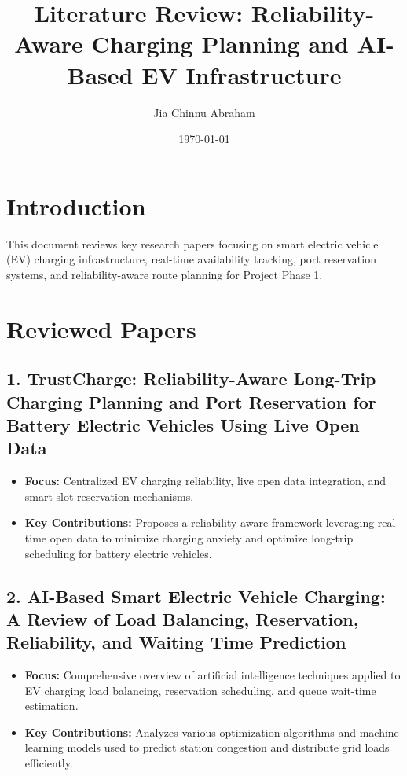 ﻿\documentclass[12pt,a4paper]{article}
\title{\textbf{Literature Review: Reliability-Aware Charging Planning and AI-Based EV Infrastructure}}
\author{Jia Chinnu Abraham}
\date{\today}
\begin{document}
\maketitle

\section{Introduction}
This document reviews key research papers focusing on smart electric vehicle (EV) charging infrastructure, real-time availability tracking, port reservation systems, and reliability-aware route planning for Project Phase 1.

\section{Reviewed Papers}

\subsection{1. TrustCharge: Reliability-Aware Long-Trip Charging Planning and Port Reservation for Battery Electric Vehicles Using Live Open Data}
\begin{itemize}
    \item \textbf{Focus:} Centralized EV charging reliability, live open data integration, and smart slot reservation mechanisms.
    \item \textbf{Key Contributions:} Proposes a reliability-aware framework leveraging real-time open data to minimize charging anxiety and optimize long-trip scheduling for battery electric vehicles.
\end{itemize}

\subsection{2. AI-Based Smart Electric Vehicle Charging: A Review of Load Balancing, Reservation, Reliability, and Waiting Time Prediction}
\begin{itemize}
    \item \textbf{Focus:} Comprehensive overview of artificial intelligence techniques applied to EV charging load balancing, reservation scheduling, and queue wait-time estimation.
    \item \textbf{Key Contributions:} Analyzes various optimization algorithms and machine learning models used to predict station congestion and distribute grid loads efficiently.
\end{itemize}
\end{document}
